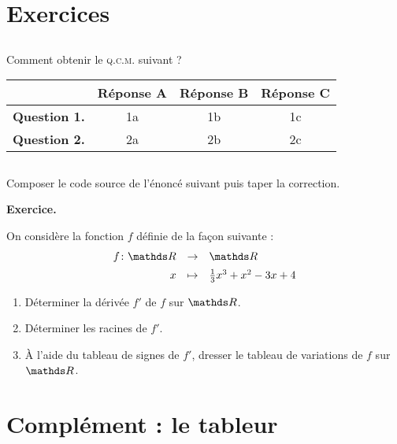 \section{Exercices}
\subsection*{\ExoFiche}
Comment obtenir le \textsc{q.c.m.} suivant ?\medskip

\begin{CadreExemple}
\begin{center}
\begin{tabular}{|c|c|c|c|}
\hline
 & Réponse A & Réponse B & Réponse C \\
\hline\hline
 \textbf{Question 1.} & 1a & 1b & 1c \\
\hline
 \textbf{Question 2.} & 2a & 2b & 2c \\
\end{tabular}
\end{center}
\end{CadreExemple}

\subsection*{\ExoFiche}

Composer le code source de l'énoncé suivant puis taper la correction.\medskip

\begin{CadreExemple}
\textbf{Exercice.}\par
    On considère la fonction $f$ définie de la façon suivante :
        \[\begin{array}{rcl}
        f \colon \R & \rightarrow & \R \\[5pt]
                    x & \mapsto & \frac 13 x^3 + x^2 - 3x + 4
    \end{array}\]
    \begin{enumerate}
        \item Déterminer la dérivée $f'$ de $f$ sur $\R$.
        \item Déterminer les racines de $f'$.
        \item À l'aide du tableau de signes de $f'$, dresser le tableau de variations de $f$ sur $\R$.
    \end{enumerate}
\end{CadreExemple}


\section{Complément : le tableur}

